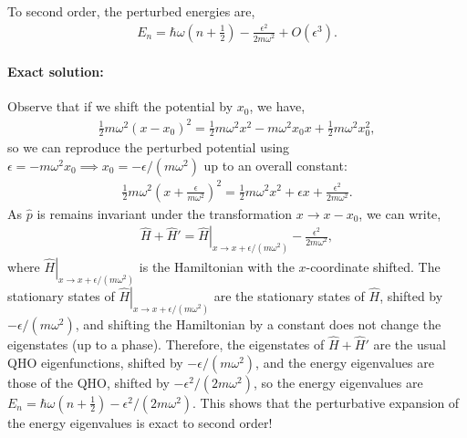 \documentclass[10pt]{article}
\newcommand{\1}{\mathbf 1}
\newcommand{\ip}[1]{\left< #1 \right>}
\begin{document}
To second order, the perturbed energies are,
\begin{align}
	E_n
	=
	\hbar \omega \left(n+\frac{1}{2}\right)
	-\frac{\epsilon^2}{2m \omega^2}
	+
	O(\epsilon^3).
\end{align}


\paragraph{Exact solution:}
Observe that if we shift the potential by $x_0$, we have,
\begin{align}
	\frac{1}{2} m \omega^2 ( x - x_0)^2
	=
	\frac{1}{2} m \omega^2 x^2
	-
	m \omega^2 x_0 x 
	+
	\frac{1}{2} m \omega^2 x_0^2,
\end{align}
so we can reproduce the perturbed potential using $\epsilon =- m \omega^2 x_0 \implies x_0 = -\epsilon/(m \omega^2)$ up to an overall constant:
\begin{align}
	\frac{1}{2} m \omega^2 \left(
		x + \frac{\epsilon}{m \omega^2}
	\right)^2
	=
	\frac{1}{2} m \omega^2 x^2
	+
	\epsilon x
	+
	\frac{\epsilon^2}{2 m \omega^2}.
\end{align}
As $\hat p$ is remains invariant under the transformation $x \to x -x_0$, we can write,
\begin{align}
	\hat H + \hat H'
	=
	\left.\hat H\right|_{x \to x + \epsilon/(m \omega^2)}
	-
	\frac{\epsilon^2}{2m \omega^2},
\end{align}
where $\left.\hat H\right|_{x \to x + \epsilon/(m \omega^2)}$ is the Hamiltonian with the $x$-coordinate shifted.
The stationary states of $\left.\hat H\right|_{x \to x + \epsilon/(m \omega^2)}$ are the stationary states of $\hat H$, shifted by $- \epsilon/(m \omega^2)$, and shifting the Hamiltonian by a constant does not change the eigenstates (up to a phase).
Therefore, the eigenstates of $\hat H + \hat H'$ are the usual QHO eigenfunctions, shifted by $-\epsilon/(m \omega^2)$, and the energy eigenvalues are those of the QHO, shifted by $-\epsilon^2/(2m \omega^2)$, so the energy eigenvalues are $E_n = 
\hbar \omega(n + \frac{1}{2}) - \epsilon^2/(2m\omega^2)$.
This shows that the perturbative expansion of the energy eigenvalues is exact to second order!



\end{document}

